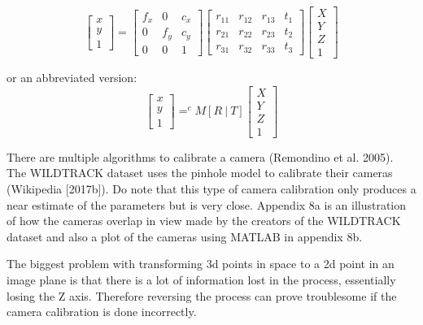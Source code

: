 \documentclass[12pt]{report}
\begin{document}
\begin{equation*}
\begin{bmatrix}
x \\
y \\
1
\end{bmatrix}
=
\begin{bmatrix}
f_{x} & 0 & c_{x} \\
0 & f_{y} & c_{y} \\
0 & 0 & 1
\end{bmatrix}
\begin{bmatrix}
r_{11} & r_{12} & r_{13} & t_{1}\\
r_{21} & r_{22} & r_{23} & t_{2}\\
r_{31} & r_{32} & r_{33} & t_{3}
\end{bmatrix}
\begin{bmatrix}
X \\
Y \\
Z \\
1
\end{bmatrix}
\end{equation*}

or an abbreviated version:
\begin{equation*}
\begin{bmatrix}
x \\
y \\
1
\end{bmatrix}
= ^{c}M[R \ |\ T]
\begin{bmatrix}
X \\
Y \\
Z \\
1
\end{bmatrix}
\end{equation*}


There are multiple algorithms to calibrate a camera (Remondino et al. 2005). The WILDTRACK dataset uses the pinhole model to calibrate their cameras (Wikipedia [2017b]). Do note that this type of camera calibration only produces a near estimate of the parameters but is very close. Appendix 8a is an illustration of how the cameras overlap in view made by the creators of the WILDTRACK dataset and also a plot of the cameras using MATLAB in appendix 8b.

\vspace{2mm}

The biggest problem with transforming 3d points in space to a 2d point in an image plane is that there is a lot of information lost in the process, essentially losing the Z axis. Therefore reversing the process can prove troublesome if the camera calibration is done incorrectly.
\end{document}
